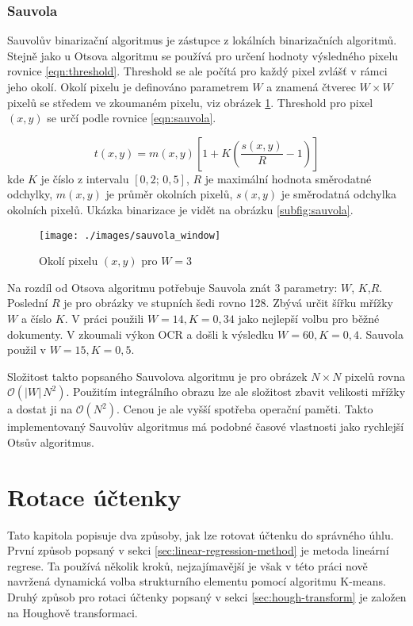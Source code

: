 \documentclass[thesis=B,czech]{FITthesis}[2019/12/23]
\begin{document}
\subsection{Sauvola}
\label{subsec:sauvola}
Sauvolův binarizační algoritmus \cite{sauvolaAdaptiveDocumentImage2000} je zástupce z lokálních binarizačních algoritmů. Stejně jako u Otsova algoritmu se používá pro určení hodnoty výsledného pixelu rovnice \ref{eqn:threshold}. Threshold se ale počítá pro každý pixel zvlášť v rámci jeho okolí. Okolí pixelu je definováno parametrem $W$ a znamená čtverec $W \times W$ pixelů se středem ve zkoumaném pixelu, viz obrázek \ref{fig:sauvola-window}. Threshold pro pixel $(x,y)$ se určí podle rovnice \ref{eqn:sauvola}.

\begin{equation}
	\label{eqn:sauvola}
	t(x,y) = m(x,y)\left[ 1 + K\left(\frac{s(x,y)}{R}-1\right) \right]
\end{equation}
kde $K$ je číslo z intervalu $[0,2;\,0,5]$, $R$ je maximální hodnota směrodatné odchylky, $m(x,y)$ je průměr okolních pixelů, $s(x,y)$ je směrodatná odchylka okolních pixelů. Ukázka binarizace je vidět na obrázku \ref{subfig:sauvola}.

\begin{figure}[H]\centering
	\texttt{[image: ./images/sauvola\_window]}
	\caption[Okolí pixelu]{Okolí pixelu $(x,y)$ pro $W=3$}\label{fig:sauvola-window}
\end{figure}

Na rozdíl od Otsova algoritmu potřebuje Sauvola znát 3 parametry: $W$, $K$,$R$. Poslední $R$ je pro obrázky ve stupních šedi rovno 128. Zbývá určit šířku mřížky $W$ a číslo $K$. V práci  \cite{badekasAutomaticEvaluationDocument2005} použili $W=14,K=0,34$ jako nejlepší volbu pro běžné dokumenty. V  \cite{rangoniOCRBasedThresholding2009} zkoumali výkon OCR a došli k výsledku $W=60, K=0,4$. Sauvola použil v  \cite{sauvolaAdaptiveDocumentImage2000} $W=15, K=0,5$.

Složitost takto popsaného Sauvolova algoritmu je pro obrázek $N \times N$ pixelů rovna $\mathcal{O}(|W|\,N^2)$. Použitím integrálního obrazu lze ale složitost zbavit velikosti mřížky a dostat ji na $\mathcal{O}(N^2)$. Cenou je ale vyšší spotřeba operační paměti. Takto implementovaný Sauvolův algoritmus má podobné časové vlastnosti jako rychlejší Otsův algoritmus. \cite{Shafait2008}

\chapter{Rotace účtenky}
\label{chapter:rotace-uctenky}
Tato kapitola popisuje dva způsoby, jak lze rotovat účtenku do správného úhlu.  První způsob popsaný v sekci \ref{sec:linear-regression-method} je metoda lineární regrese. Ta používá několik kroků, nejzajímavější je však v této práci nově navržená dynamická volba strukturního elementu pomocí algoritmu K-means. Druhý způsob pro rotaci účtenky popsaný v sekci \ref{sec:hough-transform} je založen na Houghově transformaci.
\end{document}

